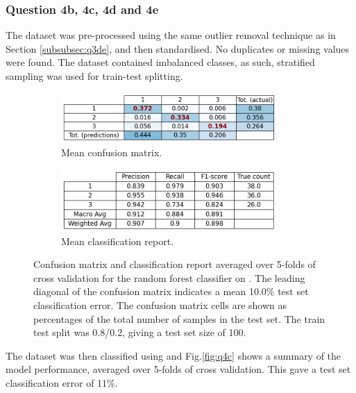 \subsubsection{Question 4b, 4c, 4d and 4e}\label{subsubsec:q4bcde}
    The dataset was pre-processed using the same outlier removal technique as in Section \ref{subsubsec:q3de}, and then
    standardised.
    No duplicates or missing values were found.
    The dataset contained imbalanced classes, as such, stratified sampling was used for train-test splitting.

    \begin{figure}[htb]
    \centering
    \begin{subfigure}{0.5\textwidth}
        \centering
        \includegraphics[width=0.9\textwidth]{./figures/q4c_confusion_matrix}
        \caption{Mean confusion matrix.}
        \label{fig:q4c_confusion_matrix}
    \end{subfigure}%
    \begin{subfigure}{0.5\textwidth}
        \centering
        \includegraphics[width=0.9\textwidth]{./figures/q4c_classification_report}
        \caption{Mean classification report.}
        \label{fig:q4c_classification_report}
    \end{subfigure}
    \caption{Confusion matrix and classification report averaged over 5-folds of cross validation for the random forest
        classifier on . The leading diagonal of the confusion matrix indicates a
        mean 10.0\% test set classification error.
        The confusion matrix cells are shown as percentages of the total number of samples in the test set.
        The train test split was 0.8/0.2, giving a test set size of 100.}
    \label{fig:q4c}
    \end{figure}

    The dataset was then classified using  and Fig.\eqref{fig:q4c} shows a summary
    of the model performance, averaged over 5-folds of cross validation.
    This gave a test set classification error of 11\%.

